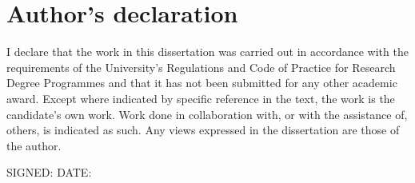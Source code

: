 %
%
%
%
%
%
\chapter*{Author's declaration}
\noindent I declare that the work in this dissertation was carried out in accordance with the requirements of  the University's Regulations and Code of Practice for Research Degree Programmes and that it  has not been submitted for any other academic award. Except where indicated by specific  reference in the text, the work is the candidate's own work. Work done in collaboration with, or with the assistance of, others, is indicated as such. Any views expressed in the dissertation are those of the author.

\vspace{3cm}
\noindent
\textsc{SIGNED:} \makebox[9cm]{\dotfill} \textsc{DATE:} \dotfill

\vspace*{\fill}

\clearpage